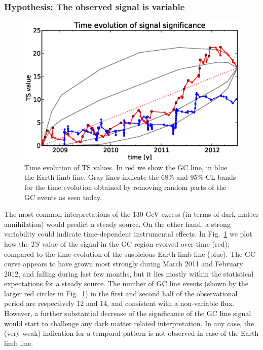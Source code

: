 \documentclass[aps,twocolumn,prd,superscriptaddress,showpacs,nofootinbib,fixfloat]{revtex4}
\begin{document}
\subsubsection{Hypothesis: The observed signal is variable}

\begin{figure}
  \begin{center}
    \includegraphics[width=1.0\linewidth]{plots/TS_time.eps}
  \end{center}
  \caption{Time evolution of TS values. In red we show the GC line, in blue
  the Earth limb line. Gray lines indicate the $68\%$ and $95\%$ CL bands for
  the time evolution obtained by removing random parts of the GC events as
  seen today.}
  \label{fig:timeevolution}
\end{figure}

The most common interpretations of the 130 GeV excess (in terms of dark matter
annihilation) would predict a steady source. On the other hand, a strong
variability could indicate time-dependent instrumental effects. In
Fig.~\ref{fig:timeevolution} we plot how the $TS$ value of the signal in the
GC region evolved over time (red); compared to the time-evolution of the
suspicious Earth limb line (blue). The GC curve appears to have grown most
strongly during March 2011 and February 2012, and falling during last few
months, but it lies mostly within the statistical expectations for a steady
source. The number of GC line events (shown by the larger red circles in
Fig.~\ref{fig:timeevolution}) in the first and second half of the
observational period are respectively 12 and 14, and consistent with a
non-variable flux. However, a further substantial decrease of the significance
of the GC line signal would start to challenge any dark matter related
interpretation.  In any case, the (very weak) indication for a temporal
pattern is not observed in case of the Earth limb line. 
\end{document}
